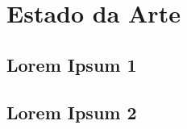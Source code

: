 \chapter[Estado da Arte]{Estado da Arte}

\section{Lorem Ipsum 1}

\lipsum[1-4]

\section{Lorem Ipsum 2}

\lipsum[1-4]
